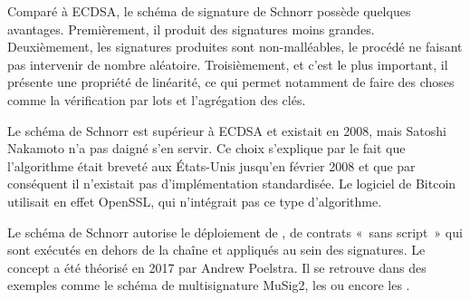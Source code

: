 Comparé à ECDSA, le schéma de signature de Schnorr possède quelques avantages. Premièrement, il produit des signatures moins grandes. Deuxièmement, les signatures produites sont non-malléables, le procédé ne faisant pas intervenir de nombre aléatoire. Troisièmement, et c'est le plus important, il présente une propriété de linéarité, ce qui permet notamment de faire des choses comme la vérification par lots et l'agrégation des clés. 

Le schéma de Schnorr est supérieur à ECDSA et existait en 2008, mais Satoshi Nakamoto n'a pas daigné s'en servir. Ce choix s'explique par le fait que l'algorithme était breveté aux États-Unis jusqu'en février 2008 et que par conséquent il n'existait pas d'implémentation standardisée. Le logiciel de Bitcoin utilisait en effet OpenSSL, qui n'intégrait pas ce type d'algorithme.

Le schéma de Schnorr autorise le déploiement de , de contrats «~sans script~» qui sont exécutés en dehors de la chaîne et appliqués au sein des signatures. Le concept a été théorisé en 2017 par Andrew Poelstra. Il se retrouve dans des exemples comme le schéma de multisignature MuSig2, les  ou encore les .

